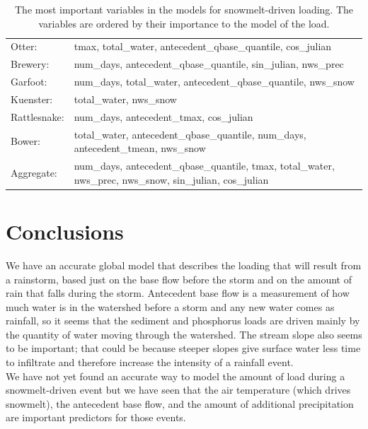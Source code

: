 \documentclass[10pt]{article}
\begin{document}
\begin{table}[h!]
\begin{center}
\begin{tabular}{ll}
        \hspace{5mm} Otter: & tmax, total\_water, antecedent\_qbase\_quantile, cos\_julian\\
        \hspace{5mm} Brewery: & num\_days, antecedent\_qbase\_quantile, sin\_julian, nws\_prec\\
        \hspace{5mm} Garfoot: & num\_days, total\_water, antecedent\_qbase\_quantile, nws\_snow\\
        \hspace{5mm} Kuenster: & total\_water, nws\_snow\\
        \hspace{5mm} Rattlesnake: & num\_days, antecedent\_tmax, cos\_julian\\
        \hspace{5mm} Bower: & total\_water, antecedent\_qbase\_quantile, num\_days, antecedent\_tmean, nws\_snow\\
        \hspace{5mm} Aggregate: & num\_days, antecedent\_qbase\_quantile, tmax, total\_water, nws\_prec, nws\_snow, sin\_julian, cos\_julian\\
    \end{tabular}
    \caption{The most important variables in the models for snowmelt-driven loading. The variables are ordered by their importance to the model of the load. \label{snow_predictor_list}}
    \end{center}
\end{table}

\section{Conclusions}
We have an accurate global model that describes the loading that will result from a rainstorm, based just on the base flow before the storm and on the amount of rain that falls during the storm. Antecedent base flow is a measurement of how much water is in the watershed before a storm and any new water comes as rainfall, so it seems that the sediment and phosphorus loads are driven mainly by the quantity of water moving through the watershed. The stream slope also seems to be important; that could be because steeper slopes give surface water less time to infiltrate and therefore increase the intensity of a rainfall event.\\

We have not yet found an accurate way to model the amount of load during a snowmelt-driven event but we have seen that the air temperature (which drives snowmelt), the antecedent base flow, and the amount of additional precipitation are important predictors for those events.\\
\end{document}
